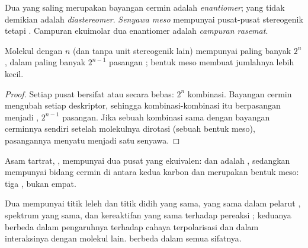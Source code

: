 \begin{definition}\label{def:b1:stereochemistry-in-depth:enantiomers}
Dua  yang saling merupakan bayangan cermin adalah
\emph{enantiomer};  yang tidak demikian
adalah \emph{diastereomer}. \emph{Senyawa
meso} mempunyai pusat-pusat stereogenik tetapi
. Campuran ekuimolar dua enantiomer adalah \emph{campuran
rasemat}.
\end{definition}

\begin{proposition}\label{prop:b1:stereochemistry-in-depth:max-stereoisomers}
Molekul dengan $n$  (dan tanpa unit stereogenik lain)
mempunyai paling banyak $2^n$ , dalam paling banyak
$2^{n-1}$ pasangan ; bentuk meso membuat jumlahnya lebih kecil.
\end{proposition}

\begin{proof}
Setiap pusat bersifat  atau  secara bebas: $2^n$ kombinasi.
Bayangan cermin mengubah setiap deskriptor, sehingga kombinasi-kombinasi
itu berpasangan menjadi , $2^{n-1}$ pasangan. Jika sebuah
kombinasi sama dengan bayangan cerminnya sendiri setelah molekulnya
dirotasi (sebuah bentuk meso), pasangannya menyatu menjadi satu senyawa.
\end{proof}

Asam tartrat, , mempunyai dua pusat yang
ekuivalen:  dan  adalah , sedangkan
 mempunyai bidang cermin di antara kedua karbon dan merupakan
bentuk meso: tiga , bukan empat.

\begin{proposition}\label{prop:b1:stereochemistry-in-depth:enantiomer-properties}
Dua  mempunyai titik leleh dan titik didih yang sama,
 yang sama dalam pelarut , spektrum yang sama, dan
kereaktifan yang sama terhadap pereaksi ; keduanya berbeda dalam
pengaruhnya terhadap cahaya terpolarisasi dan dalam interaksinya dengan
molekul  lain.  berbeda dalam semua sifatnya.
\end{proposition}

